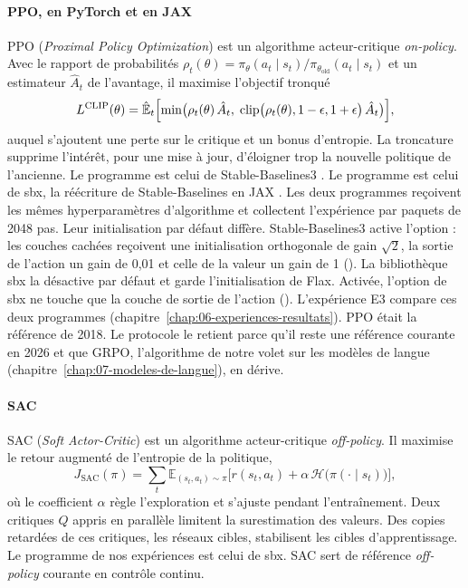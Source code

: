 \paragraph{PPO, en PyTorch et en JAX}
PPO (\emph{Proximal Policy Optimization}) \parencite{schulman2017ppo} est un algorithme acteur-critique
\emph{on-policy}. Avec le rapport de probabilités
$\rho_t(\theta) = \pi_\theta(a_t \mid s_t) / \pi_{\theta_\text{old}}(a_t \mid s_t)$ et un estimateur
$\hat{A}_t$ de l'avantage, il maximise l'objectif tronqué
\begin{equation}
  L^{\text{CLIP}}(\theta) = \hat{\mathbb{E}}_t\Bigl[ \min\bigl( \rho_t(\theta)\, \hat{A}_t,\;
  \operatorname{clip}\bigl(\rho_t(\theta), 1 - \epsilon, 1 + \epsilon\bigr)\, \hat{A}_t \bigr) \Bigr],
\end{equation}
auquel s'ajoutent une perte sur le critique et un bonus d'entropie. La troncature supprime l'intérêt, pour une mise à
jour, d'éloigner trop la nouvelle politique de l'ancienne. Le programme  est celui de
Stable-Baselines3 \parencite{raffin2021sb3}. Le programme  est celui de sbx, la réécriture
de Stable-Baselines en JAX \parencite{raffin2023sbx,bradbury2018jax}. Les deux programmes reçoivent
les mêmes hyperparamètres d'algorithme et collectent l'expérience par paquets de \num{2048} pas. Leur
initialisation par défaut diffère. Stable-Baselines3 active l'option  : les couches
cachées reçoivent une initialisation orthogonale de gain $\sqrt{2}$, la sortie de l'action un gain de
0,01 et celle de la valeur un gain de 1 (). La bibliothèque sbx la
désactive par défaut et garde l'initialisation de Flax. Activée, l'option de sbx ne touche que la couche de
sortie de l'action (). L'expérience E3 compare ces deux programmes
(chapitre~\ref{chap:06-experiences-resultats}). PPO était la référence de 2018. Le protocole le retient parce qu'il reste une
référence courante en 2026 et que GRPO, l'algorithme de notre volet sur les modèles de langue
(chapitre~\ref{chap:07-modeles-de-langue}), en dérive.

\paragraph{SAC}
SAC (\emph{Soft Actor-Critic}) \parencite{haarnoja2018sac} est un algorithme acteur-critique
\emph{off-policy}. Il maximise le retour augmenté de l'entropie de la politique,
\begin{equation}
  J_{\text{SAC}}(\pi) = \sum_t \mathbb{E}_{(s_t, a_t) \sim \pi}\bigl[ r(s_t, a_t) + \alpha\, \mathcal{H}\bigl(\pi(\cdot \mid s_t)\bigr) \bigr],
\end{equation}
où le coefficient $\alpha$ règle l'exploration et s'ajuste pendant l'entraînement. Deux critiques $Q$
appris en parallèle limitent la surestimation des valeurs. Des copies retardées de ces critiques, les
réseaux cibles, stabilisent les cibles d'apprentissage. Le programme  de nos expériences est
celui de sbx. SAC sert de référence \emph{off-policy} courante en contrôle continu.

